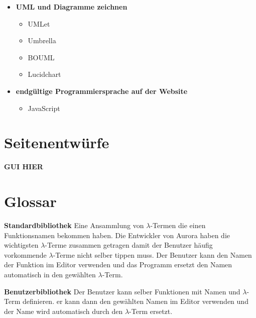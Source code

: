 \documentclass[parskip=full,11pt,twoside]{scrartcl}
\begin{document}
\begin{description}
\begin{itemize}
		\item \textbf{UML und Diagramme zeichnen}
			\begin{itemize}
				\item UMLet
				\item Umbrella
				\item BOUML
				\item Lucidchart
			\end{itemize}
		\item \textbf{endgültige Programmiersprache auf der Website}
			\begin{itemize}
				\item JavaScript
			\end{itemize}
	\end{itemize}
\newpage
\appendix
\end{description}
\section{Seitenentwürfe}
\textbf{GUI HIER}


\newpage
\section{Glossar}

\textbf{Standardbibliothek}
\newline
Eine Ansammlung von $\lambda$-Termen die einen Funktionsnamen bekommen haben. Die Entwickler von Aurora haben die wichtigsten $\lambda$-Terme zusammen getragen damit der Benutzer häufig vorkommende $\lambda$-Terme nicht selber tippen muss. Der Benutzer kann den Namen der Funktion im Editor verwenden und das Programm ersetzt den Namen automatisch in den gewählten $\lambda$-Term.

\textbf{Benutzerbibliothek}
\newline
Der Benutzer kann selber Funktionen mit Namen und $\lambda$-Term definieren. er kann dann den gewählten Namen im Editor verwenden und der Name wird automatisch durch den $\lambda$-Term ersetzt.
\end{document}
